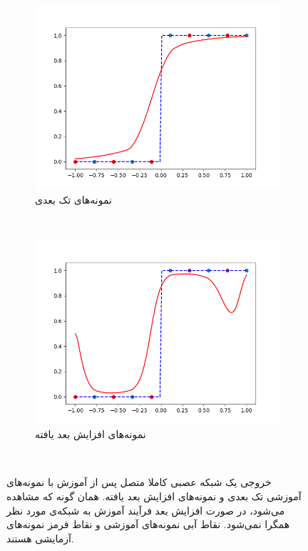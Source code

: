 \documentclass[12pt,onecolumn,a4paper]{article}
\begin{document}
\begin{figure}
	\centering
	\begin{subfigure}[b]{0.45\textwidth}
		\includegraphics[width=\textwidth]{1d_plain.png}
		\caption{نمونه‌های تک بعدی}
		\label{fig:1dplain}
	\end{subfigure}
	~ %
	\begin{subfigure}[b]{0.45\textwidth}
		\includegraphics[width=\textwidth]{1d_aug.png}
		\caption{نمونه‌های افزایش بعد یافته}
		\label{fig:1daug}
	\end{subfigure}
	~ %
	\caption{
		خروجی یک شبکه عصبی کاملا متصل پس از آموزش با نمونه‌های آموزشی تک بعدی و نمونه‌های افزایش بعد یافته. همان گونه که مشاهده می‌شود، در صورت افزایش بعد فرآیند آموزش به شبکه‌ی مورد نظر همگرا نمی‌شود. نقاط آبی نمونه‌های آموزشی و نقاط قرمز نمونه‌های آزمایشی هستند.
	}
	\label{fig:1d}
\end{figure}
\end{document}
